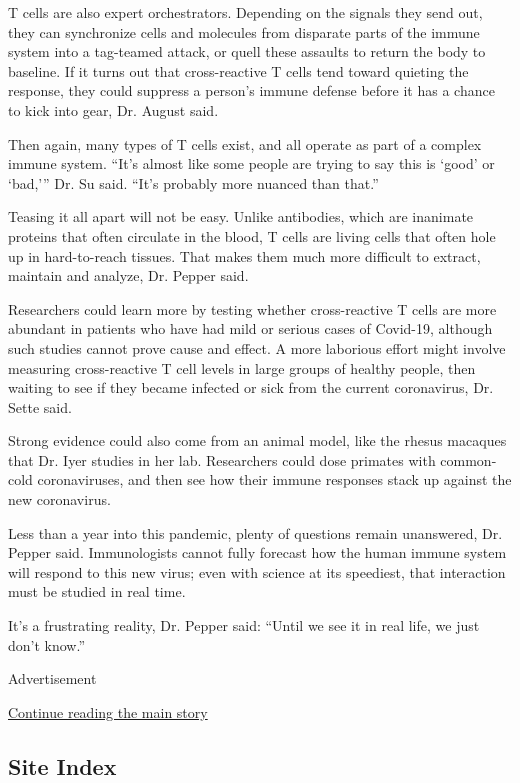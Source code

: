 T cells are also expert orchestrators. Depending on the signals they
send out, they can synchronize cells and molecules from disparate parts
of the immune system into a tag-teamed attack, or quell these assaults
to return the body to baseline. If it turns out that cross-reactive T
cells tend toward quieting the response, they could suppress a person's
immune defense before it has a chance to kick into gear, Dr. August
said.

Then again, many types of T cells exist, and all operate as part of a
complex immune system. ``It's almost like some people are trying to say
this is `good' or `bad,''' Dr. Su said. ``It's probably more nuanced
than that.''

Teasing it all apart will not be easy. Unlike antibodies, which are
inanimate proteins that often circulate in the blood, T cells are living
cells that often hole up in hard-to-reach tissues. That makes them much
more difficult to extract, maintain and analyze, Dr. Pepper said.

Researchers could learn more by testing whether cross-reactive T cells
are more abundant in patients who have had mild or serious cases of
Covid-19, although such studies cannot prove cause and effect. A more
laborious effort might involve measuring cross-reactive T cell levels in
large groups of healthy people, then waiting to see if they became
infected or sick from the current coronavirus, Dr. Sette said.

Strong evidence could also come from an animal model, like the rhesus
macaques that Dr. Iyer studies in her lab. Researchers could dose
primates with common-cold coronaviruses, and then see how their immune
responses stack up against the new coronavirus.

Less than a year into this pandemic, plenty of questions remain
unanswered, Dr. Pepper said. Immunologists cannot fully forecast how the
human immune system will respond to this new virus; even with science at
its speediest, that interaction must be studied in real time.

It's a frustrating reality, Dr. Pepper said: ``Until we see it in real
life, we just don't know.''

Advertisement

\protect\hyperlink{after-bottom}{Continue reading the main story}

\hypertarget{site-index}{%
\subsection{Site Index}\label{site-index}}

